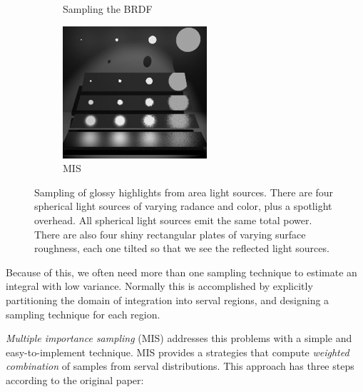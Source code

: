 \begin{figure}
\begin{subfigure}[b]{0.328\textwidth}
		\caption{Sampling the BRDF}
	\end{subfigure}
	\begin{subfigure}[b]{0.328\textwidth}
		\includegraphics[width=1.\textwidth]{graphics/gi/mis-3}
		\caption{MIS}
	\end{subfigure}
	\caption{Sampling of glossy highlights from area light sources. There are four spherical light sources of varying radance and color, plus a spotlight overhead. All spherical light sources emit the same total power. There are also four shiny rectangular plates of varying surface roughness, each one tilted so that we see the reflected light sources.}
\end{figure}

Because of this, we often need more than one sampling technique to estimate an integral with low variance. Normally this is accomplished by explicitly partitioning the domain of integration into serval regions, and designing a sampling technique for each region. 

\textit{Multiple importance sampling} (MIS) addresses this problems with a simple and easy-to-implement technique. MIS provides a strategies that compute \textit{weighted combination} of samples from serval distributions. This approach has three steps according to the original paper\cite[28mm]{a:OptimallyCombiningSamplingTechniquesforMonteCarloRendering}:

